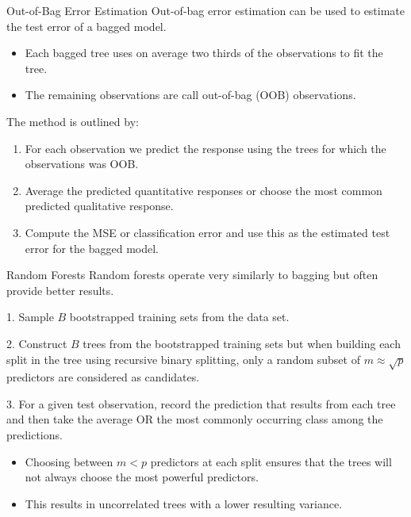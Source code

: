 \documentclass[
  ignorenonframetext,
  aspectratio=169,
]{beamer}
\begin{document}
\begin{frame}{Out-of-Bag Error Estimation}
\protect\hypertarget{out-of-bag-error-estimation}{}
Out-of-bag error estimation can be used to estimate the test error of a
bagged model.

\begin{itemize}
\item
  Each bagged tree uses on average two thirds of the observations to fit
  the tree.
\item
  The remaining observations are call out-of-bag (OOB) observations.
\end{itemize}

The method is outlined by:

\begin{enumerate}
\item
  For each observation we predict the response using the trees for which
  the observations was OOB.
\item
  Average the predicted quantitative responses or choose the most common
  predicted qualitative response.
\item
  Compute the MSE or classification error and use this as the estimated
  test error for the bagged model.
\end{enumerate}
\end{frame}

\begin{frame}{Random Forests}
\protect\hypertarget{random-forests}{}
Random forests operate very similarly to bagging but often provide
better results.

\begin{exampleblock}{}
1. Sample $B$ bootstrapped training sets from the data set.

2. Construct $B$ trees from the bootstrapped training sets but when building each split in the tree using recursive binary splitting, only a random subset of $m \approx \sqrt{p}$ predictors are considered as candidates.

3. For a given test observation, record the prediction that results from each tree and then take the average OR the most commonly occurring class among the predictions.
\end{exampleblock}

\begin{itemize}
\item
  Choosing between \(m < p\) predictors at each split ensures that the
  trees will not always choose the most powerful predictors.
\item
  This results in uncorrelated trees with a lower resulting variance.
\end{itemize}
\end{frame}
\end{document}
